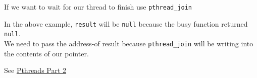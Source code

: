 If we want to wait for our thread to finish use \texttt{pthread\_join}

\begin{Shaded}
\begin{Highlighting}[]
 
\end{Highlighting}
\end{Shaded}

In the above example, \texttt{result} will be \texttt{null} because the
busy function returned \texttt{null}.\\We need to pass the address-of
result because \texttt{pthread\_join} will be writing into the contents
of our pointer.

See
\href{https://github.com/angrave/SystemProgramming/wiki/Pthreads\%2C-Part-2\%3A-Usage-in-Practice}{Pthreads
Part 2}
